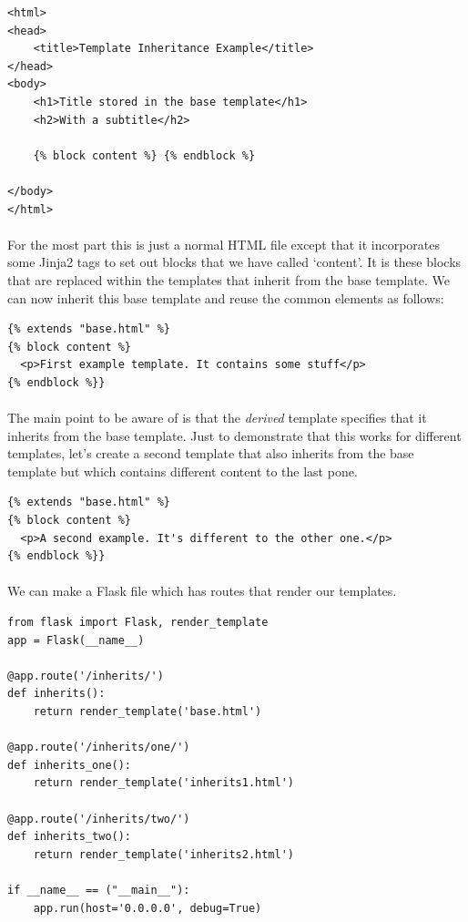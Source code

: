 \documentclass[12pt, a4paper, oneside]{book}
\begin{document}
\begin{lstlisting}
<html>
<head>
    <title>Template Inheritance Example</title>
</head>
<body>
    <h1>Title stored in the base template</h1>
    <h2>With a subtitle</h2>

    {% block content %} {% endblock %}

</body>
</html>
\end{lstlisting}

\paragraph{} For the most part this is just a normal HTML file except that it incorporates some Jinja2 tags to set out blocks that we have called `content'. It is these blocks that are replaced within the templates that inherit from the base template. We can now inherit this base template and reuse the common elements as follows:

\begin{lstlisting}
{% extends "base.html" %}
{% block content %}
  <p>First example template. It contains some stuff</p>
{% endblock %}}
\end{lstlisting}

\paragraph{} The main point to be aware of is that the \emph{derived} template specifies that it inherits from the base template. Just to demonstrate that this works for different templates, let's create a second template that also inherits from the base template but which contains different content to the last pone.

\begin{lstlisting}
{% extends "base.html" %}
{% block content %}
  <p>A second example. It's different to the other one.</p>
{% endblock %}}
\end{lstlisting}

\paragraph{} We can make a Flask file which has routes that render our templates.

\begin{lstlisting}
from flask import Flask, render_template
app = Flask(__name__)

@app.route('/inherits/')
def inherits():
    return render_template('base.html')

@app.route('/inherits/one/')
def inherits_one():
    return render_template('inherits1.html')

@app.route('/inherits/two/')
def inherits_two():
    return render_template('inherits2.html')

if __name__ == ("__main__"):
    app.run(host='0.0.0.0', debug=True)
\end{lstlisting}
\end{document}
